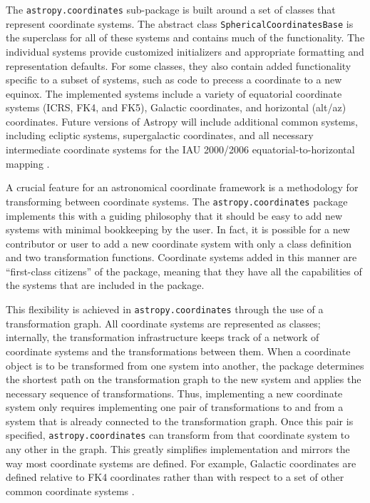 \documentclass[traditabstract]{aa}
\begin{document}
The \texttt{astropy.coordinates} sub-package
is built around a set of classes that represent coordinate systems.
The abstract class \texttt{SphericalCoordinatesBase} is the superclass
for all of these systems and contains much of the functionality. The
individual systems provide customized initializers and appropriate
formatting and representation defaults. For some classes, they also
contain added functionality specific to a subset of systems, such as
code to precess a coordinate to a new equinox. The implemented
systems include a variety of equatorial coordinate systems (ICRS, FK4,
and FK5), Galactic coordinates, and horizontal (alt/az) coordinates.
Future versions of Astropy will include additional
common systems, including ecliptic systems, supergalactic coordinates,
and all necessary intermediate coordinate systems for the IAU
2000/2006 equatorial-to-horizontal mapping \citep[e.g.,][]{soffel03,
  usnocircular179}.



A crucial feature for an astronomical coordinate framework is a methodology for
transforming between coordinate systems. The \texttt{astropy.coordinates}
package implements this with a guiding philosophy that it
should be easy to add new systems with minimal bookkeeping by the
user. In fact, it is possible for a new contributor or user to add a new
coordinate system with only a class definition and two transformation
functions. Coordinate systems added in this manner are ``first-class citizens'' of the
package, meaning that they have all the capabilities of the systems that are included in the
package.

This flexibility is achieved in \texttt{astropy.coordinates} through the use
of a transformation graph.
All coordinate systems are represented as classes; internally, the
transformation infrastructure keeps track of a network of coordinate systems
and the transformations between them.  When a coordinate
object is to be transformed from one system into another, the package determines the shortest path on
the transformation graph to the new system and applies the necessary
sequence of transformations. Thus, implementing a new coordinate system
only requires implementing one
pair of transformations to and from a system that is already connected to the
transformation graph. Once this pair is specified,
\texttt{astropy.coordinates} can transform from that coordinate
system to any other in the graph. This greatly simplifies
implementation and mirrors the way most coordinate systems are
defined. For example, Galactic coordinates are defined relative to FK4
coordinates rather than with respect to a set of other common coordinate
systems \citep{galcoords, reid04}.
\end{document}
